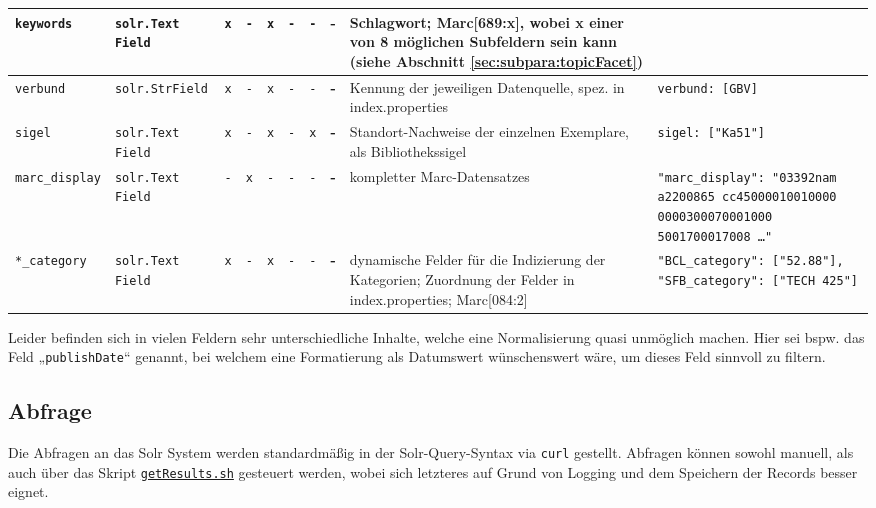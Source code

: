 \documentclass[10pt]{article}
\begin{document}
\begin{center}
\begin{longtable}{| p{2cm} | p{2.3cm} | p{0.1cm} | p{0.1cm} | p{0.1cm} | p{0.1cm}  p{0.1cm}  p{0.1cm} | p{4cm} | p{2.8cm} | }
		\texttt{keywords} 
		& \texttt{solr.Text Field} 
		& \texttt{x} 
		& \texttt{-} 
		& \texttt{x} 
		& \texttt{-} & \texttt{-} & \textbf{-} 
		& Schlagwort; Marc[689:x], wobei x einer von 8 möglichen Subfeldern sein kann (siehe Abschnitt \ref{sec:subpara:topicFacet})
		&  \\ \hline
		
		\texttt{verbund} 
		& \texttt{solr.StrField} 
		& \texttt{x} 
		& \texttt{-} 
		& \texttt{x} 
		& \texttt{-} & \texttt{-} & \textbf{-} 
		& Kennung der jeweiligen Datenquelle, spez. in index.properties
		& \texttt{verbund: [GBV]} \\ \hline
		
		\texttt{sigel} 
		& \texttt{solr.Text Field} 
		& \texttt{x} 
		& \texttt{-} 
		& \texttt{x} 
		& \texttt{-} & \texttt{x} & \textbf{-} 
		& Standort-Nachweise der einzelnen Exemplare, als Bibliothekssigel
		& \texttt{sigel: ["Ka51"]} \\ \hline
		
		\texttt{marc\_display} 
		& \texttt{solr.Text Field} 
		& \texttt{-} 
		& \texttt{x} 
		& \texttt{-} 
		& \texttt{-} & \texttt{-} & \textbf{-} 
		& kompletter Marc-Datensatzes
		& \texttt{"marc\_display": "03392nam a2200865 cc45000010010000 0000300070001000 5001700017008 …"} \\ \hline
		
		\texttt{*\_category} 
		& \texttt{solr.Text Field} 
		& \texttt{x} 
		& \texttt{-} 
		& \texttt{x} 
		& \texttt{-} & \texttt{-} & \textbf{-} 
		& dynamische Felder für die Indizierung der Kategorien; Zuordnung der Felder in index.properties; Marc[084:2]
		& \texttt{"BCL\_category": ["52.88"], "SFB\_category": ["TECH 425"]} \\ \hline
	\end{longtable}
\end{center}
Leider befinden sich in vielen Feldern sehr unterschiedliche Inhalte, welche eine Normalisierung quasi unmöglich machen. Hier sei bspw. das Feld „\texttt{publishDate}“ genannt, bei welchem eine Formatierung als Datumswert wünschenswert wäre, um dieses Feld sinnvoll zu filtern.

\subsection{Abfrage}
Die Abfragen an das Solr System werden standardmäßig in der Solr-Query-Syntax via \texttt{curl} gestellt. Abfragen können sowohl manuell, als auch über das Skript \hyperref[sec:para:getResults]{\texttt{getResults.sh}} gesteuert werden, wobei sich letzteres auf Grund von Logging und dem Speichern der Records besser eignet. 
\end{document}
